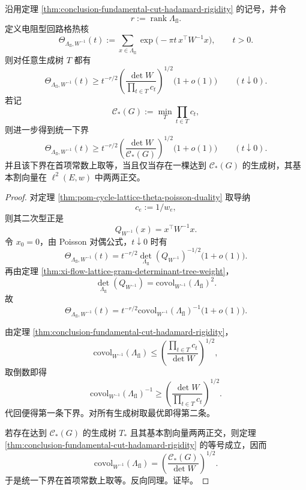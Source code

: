 \begin{theorem}\label{thm:conclusion-cycle-lattice-theta-tree-budget-lower-bound}
沿用定理 \ref{thm:conclusion-fundamental-cut-hadamard-rigidity} 的记号，并令
\[
r:=\operatorname{rank}\Lambda_{\mathrm{fl}}.
\]
定义电阻型回路格热核
\[
\Theta_{\Lambda_{\mathrm{fl}},W^{-1}}(t)
:=
\sum_{x\in\Lambda_{\mathrm{fl}}}
\exp\!\bigl(-\pi t\,x^\top W^{-1}x\bigr),
\qquad t>0.
\]
则对任意生成树 \(T\) 都有
\[
\Theta_{\Lambda_{\mathrm{fl}},W^{-1}}(t)
\ge
t^{-r/2}
\left(\frac{\det W}{\prod_{t\in T}c_t}\right)^{1/2}
\bigl(1+o(1)\bigr)
\qquad (t\downarrow 0).
\]
若记
\[
\mathcal C_\ast(G):=\min_T \prod_{t\in T}c_t,
\]
则进一步得到统一下界
\[
\Theta_{\Lambda_{\mathrm{fl}},W^{-1}}(t)
\ge
t^{-r/2}
\left(\frac{\det W}{\mathcal C_\ast(G)}\right)^{1/2}
\bigl(1+o(1)\bigr)
\qquad (t\downarrow 0).
\]
并且该下界在首项常数上取等，当且仅当存在一棵达到 \(\mathcal C_\ast(G)\) 的生成树，其基本割向量在 \(\ell^2(E,w)\) 中两两正交。
\end{theorem}
\begin{proof}
对定理 \ref{thm:pom-cycle-lattice-theta-poisson-duality} 取导纳
\[
c_e:=1/w_e,
\]
则其二次型正是
\[
Q_{W^{-1}}(x)=x^\top W^{-1}x.
\]
令 \(x_0=0\)，由 Poisson 对偶公式，\(t\downarrow 0\) 时有
\[
\Theta_{\Lambda_{\mathrm{fl}},W^{-1}}(t)
=
t^{-r/2}\det_{\Lambda_{\mathrm{fl}}}(Q_{W^{-1}})^{-1/2}\bigl(1+o(1)\bigr).
\]
再由定理 \ref{thm:xi-flow-lattice-gram-determinant-tree-weight}，
\[
\det_{\Lambda_{\mathrm{fl}}}(Q_{W^{-1}})
=
\mathrm{covol}_{W^{-1}}(\Lambda_{\mathrm{fl}})^2.
\]
故
\[
\Theta_{\Lambda_{\mathrm{fl}},W^{-1}}(t)
=
t^{-r/2}\mathrm{covol}_{W^{-1}}(\Lambda_{\mathrm{fl}})^{-1}\bigl(1+o(1)\bigr).
\]

由定理 \ref{thm:conclusion-fundamental-cut-hadamard-rigidity}，
\[
\mathrm{covol}_{W^{-1}}(\Lambda_{\mathrm{fl}})
\le
\left(\frac{\prod_{t\in T}c_t}{\det W}\right)^{1/2},
\]
取倒数即得
\[
\mathrm{covol}_{W^{-1}}(\Lambda_{\mathrm{fl}})^{-1}
\ge
\left(\frac{\det W}{\prod_{t\in T}c_t}\right)^{1/2}.
\]
代回便得第一条下界。对所有生成树取最优即得第二条。

若存在达到 \(\mathcal C_\ast(G)\) 的生成树 \(T_\ast\) 且其基本割向量两两正交，则定理 \ref{thm:conclusion-fundamental-cut-hadamard-rigidity} 的等号成立，因而
\[
\mathrm{covol}_{W^{-1}}(\Lambda_{\mathrm{fl}})
=
\left(\frac{\mathcal C_\ast(G)}{\det W}\right)^{1/2}.
\]
于是统一下界在首项常数上取等。反向同理。证毕。
\end{proof}

